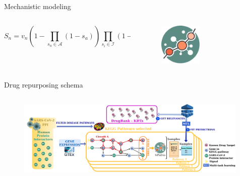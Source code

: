\documentclass[compress,ignorenonframetext,aspectratio=1610]{beamer}
\begin{document}
\begin{frame}{Mechanistic modeling}
\begin{columns}
\begin{column}{0.8\textwidth}
		{\normalsize
			\[
				S_{n} = v_{n} \left( 1 - \prod_{s_{a} \in \mathcal{A}} \left( 1 - s_{a} \right) \right) \prod_{s_{i} \in \mathcal{I}} \left( 1 - s_{i} \right)
			\]
		}
	\end{column}
	\begin{column}{0.2\textwidth}
		\begin{figure}
			\centering
			\includegraphics[width=0.5\textwidth]{figs/logos/hipathia_icon.pdf}
		\end{figure}
	\end{column}
\end{columns}


\end{frame}



\begin{frame}{Drug repurposing schema}
	\begin{columns}
		\begin{figure}
			\includegraphics[width=0.99\textwidth]{figs/methods/COVI-19_drugRepo.png}
		\end{figure}

	\end{columns}
\end{frame}
\end{document}
